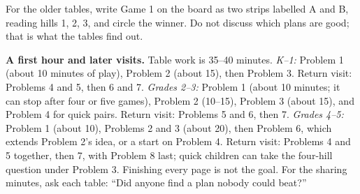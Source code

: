 \documentclass[11pt]{article}
\newcommand{\mat}[6]{%
  \foreach \i/\n in {0/#3,1/#4,2/#5}{%
    \draw[line width=.7pt,fill=black!4] ({#1+1.3*\i},#2) ellipse (.5 and .16);
    \node[font=\scriptsize\bfseries] at ({#1+1.3*\i},{#2-.4}) {\the\numexpr\i+1\relax};
    \ifnum\n>0 \foreach \k in {1,...,\n}{%
      \draw[line width=.5pt,fill=black!25] ({#1+1.3*\i-.15},{#2+.3*(\k-1)}) rectangle ({#1+1.3*\i+.15},{#2+.3*\k});}\fi}
  \foreach \t in {#6}{\ifnum\t>0 \fill ({#1+1.3*(\t-1)+.36},{#2-.02}) circle (.11);\fi}}
\newcommand{\strp}[5]{%
  \foreach \i/\v in {0/#3,1/#4,2/#5}{%
    \draw[line width=.6pt] ({#1+.55*\i},#2) rectangle ({#1+.55*(\i+1)},{#2+.5});
    \node at ({#1+.55*\i+.275},{#2+.25}) {\v};}}
\begin{document}
For the older tables, write Game 1 on the board as two strips labelled A and B, reading hills 1, 2, 3, and circle the winner. Do not discuss which plans are good; that is what the tables find out.
\begin{center}
\end{center}

\textbf{A first hour and later visits.} Table work is 35--40 minutes. \emph{K--1:} Problem 1 (about 10 minutes of play), Problem 2 (about 15), then Problem 3. Return visit: Problems 4 and 5, then 6 and 7. \emph{Grades 2--3:} Problem 1 (about 10 minutes; it can stop after four or five games), Problem 2 (10--15), Problem 3 (about 15), and Problem 4 for quick pairs. Return visit: Problems 5 and 6, then 7. \emph{Grades 4--5:} Problem 1 (about 10), Problems 2 and 3 (about 20), then Problem 6, which extends Problem 2's idea, or a start on Problem 4. Return visit: Problems 4 and 5 together, then 7, with Problem 8 last; quick children can take the four-hill question under Problem 3. Finishing every page is not the goal. For the sharing minutes, ask each table: ``Did anyone find a plan nobody could beat?''


\end{document}
